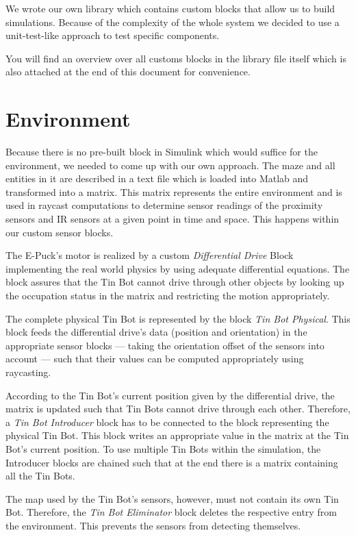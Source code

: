 \documentclass[a4paper,parskip,headheight=38pt]{scrartcl} %
\begin{document}
We wrote our own library which contains custom blocks that allow us to build simulations. Because of the complexity of the whole system we decided to use a unit-test-like approach to test specific components.

You will find an overview over all customs blocks in the library file itself which is also attached at the end of this document for convenience.

\section{Environment}
Because there is no pre-built block in Simulink which would suffice for the environment, we needed to come up with our own approach. The maze and all entities in it are described in a text file which is loaded into Matlab and transformed into a matrix. This matrix represents the entire environment and is used in raycast computations to determine sensor readings of the proximity sensors and IR sensors at a given point in time and space. This happens within our custom sensor blocks.

The E-Puck's motor is realized by a custom \emph{Differential Drive} Block implementing the real world physics by using adequate differential equations. The block assures that the Tin Bot cannot drive through other objects by looking up the occupation status in the matrix and restricting the motion appropriately.

The complete physical Tin Bot is represented by the block \emph{Tin Bot Physical}. This block feeds the differential drive's data (position and orientation) in the appropriate sensor blocks — taking the orientation offset of the sensors into account — such that their values can be computed appropriately using raycasting.

According to the Tin Bot's current position given by the differential drive, the matrix is updated such that Tin Bots cannot drive through each other. Therefore, a \emph{Tin Bot Introducer} block has to be connected to the block representing the physical Tin Bot. This block writes an appropriate value in the matrix at the Tin Bot's current position. To use multiple Tin Bots within the simulation, the Introducer blocks are chained such that at the end there is a matrix containing all the Tin Bots.

The map used by the Tin Bot's sensors, however, must not contain its own Tin Bot. Therefore, the \emph{Tin Bot Eliminator} block deletes the respective entry from the environment. This prevents the sensors from detecting themselves.
\end{document}
